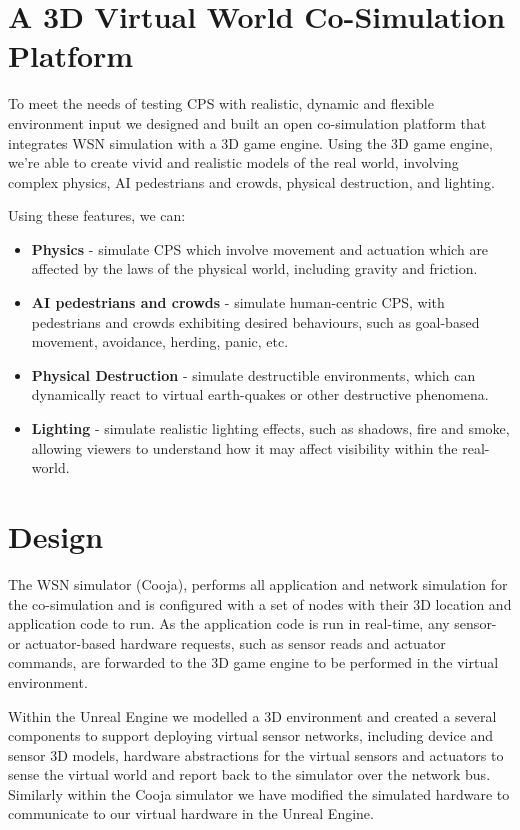 \section{A 3D Virtual World Co-Simulation Platform} %
\label{sec:a_3d_co_simulation_platform}
To meet the needs of testing CPS with realistic, dynamic and flexible environment input we designed and built an open co-simulation platform that integrates WSN simulation with a 3D game engine. Using the 3D game engine, we're able to create vivid and realistic models of the real world, involving complex physics, AI pedestrians and crowds, physical destruction, and lighting. 

Using these features, we can:
\begin{itemize}
   \item \textbf{Physics} - simulate CPS which involve movement and actuation which are affected by the laws of the physical world, including gravity and friction. 
   \item \textbf{AI pedestrians and crowds} - simulate human-centric CPS, with pedestrians and crowds exhibiting desired behaviours, such as goal-based movement, avoidance, herding, panic, etc.
   \item \textbf{Physical Destruction} - simulate destructible environments, which can dynamically react to virtual earth-quakes or other destructive phenomena.
   \item \textbf{Lighting} - simulate realistic lighting effects, such as shadows, fire and smoke, allowing viewers to understand how it may affect visibility within the real-world. 
 \end{itemize} 

\section{Design}
\label{sec:Design}

The WSN simulator (Cooja), performs all application and network simulation for the co-simulation and is configured with a set of nodes with their 3D location and application code to run. As the application code is run in real-time, any sensor- or actuator-based hardware requests, such as sensor reads and actuator commands, are forwarded to the 3D game engine to be performed in the virtual environment.

Within the Unreal Engine we modelled a 3D environment and created a several components to support deploying virtual sensor networks, including device and sensor 3D models, hardware abstractions for the virtual sensors and actuators to sense the virtual world and report back to the simulator over the network bus. Similarly within the Cooja simulator we have modified the simulated hardware to communicate to our virtual hardware in the Unreal Engine.

